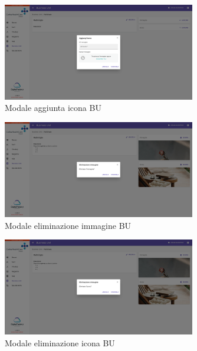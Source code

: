 \begin{figure}[H]
    \centering
    \includegraphics[width=0.75\textwidth]{images/capitolo5/f8_businessUnits/ModalBusinessUnit_createIcon.png} 
    \caption{Modale aggiunta icona BU} 
    \label{fig:ModalBusinessUnit_createIcon}
\end{figure}

\begin{figure}[H]
    \centering
    \includegraphics[width=0.75\textwidth]{images/capitolo5/f8_businessUnits/ModalBusinessUnit_deleteImage.png} 
    \caption{Modale eliminazione immagine BU} 
    \label{fig:ModalBusinessUnit_deleteImage}
\end{figure}

\begin{figure}[H]
    \centering
    \includegraphics[width=0.75\textwidth]{images/capitolo5/f8_businessUnits/ModalBusinessUnit_deleteIcon.png} 
    \caption{Modale eliminazione icona BU} 
    \label{fig:ModalBusinessUnit_deleteIcon}
\end{figure}

